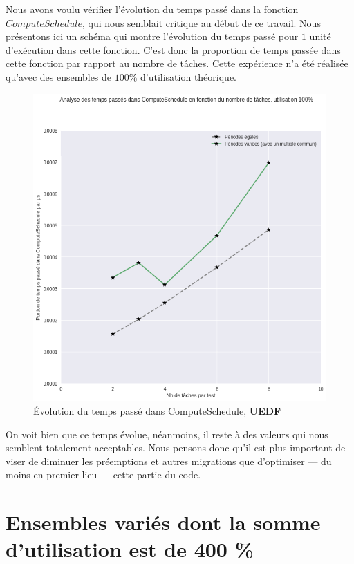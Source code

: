 	Nous avons voulu vérifier l'évolution du temps passé dans la fonction $ComputeSchedule$, qui nous semblait critique 
	au début de ce travail. Nous présentons ici un schéma qui montre 
	l'évolution du temps passé pour $1$ unité d'exécution dans cette fonction. C'est donc la 
	proportion de temps passée dans cette fonction par rapport au nombre de tâches. \newline
	Cette expérience n'a été réalisée qu'avec des ensembles de $100$\% d'utilisation théorique.

	\begin{figure}[H]
	\label{timeevolution}
		\caption{Évolution du temps passé dans ComputeSchedule, \textbf{UEDF}}
		\includegraphics[scale=0.5]{img/wcet/elapsedInCompueSchedule}
	\end{figure}		

	On voit bien que ce temps évolue, néanmoins, il reste à des valeurs qui nous semblent totalement acceptables.
	Nous pensons donc qu'il est plus important de viser de diminuer les préemptions et autres migrations que 
	d'optimiser --- du moins en premier lieu --- cette partie du code.
	
	
\section{Ensembles variés dont la somme d'utilisation est de 400 \%}

